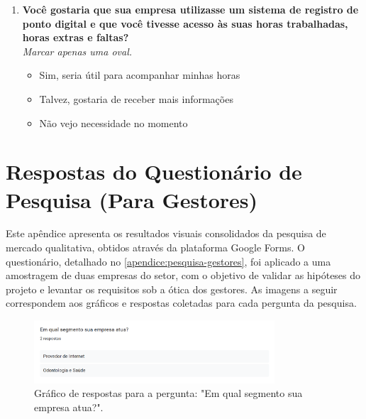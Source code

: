\begin{apendicesenv}
\begin{enumerate}
  \item \textbf{Você gostaria que sua empresa utilizasse um sistema de registro de ponto digital e que você tivesse acesso às suas horas trabalhadas, horas extras e faltas?} \\
        \textit{Marcar apenas uma oval.}
        \begin{itemize}
          \item Sim, seria útil para acompanhar minhas horas
          \item Talvez, gostaria de receber mais informações
          \item Não vejo necessidade no momento
        \end{itemize}
\end{enumerate}


\chapter{Respostas do Questionário de Pesquisa (Para Gestores)}
\label{apendice:respostas-gestores}

Este apêndice apresenta os resultados visuais consolidados da pesquisa de mercado qualitativa, obtidos através da plataforma Google Forms. O questionário, detalhado no \autoref{apendice:pesquisa-gestores}, foi aplicado a uma amostragem de duas empresas do setor, com o objetivo de validar as hipóteses do projeto e levantar os requisitos sob a ótica dos gestores. As imagens a seguir correspondem aos gráficos e respostas coletadas para cada pergunta da pesquisa.


\begin{figure}[h!]
  \centering
  \includegraphics[width=0.8\textwidth]{imagens/segmento.png}
  \caption{Gráfico de respostas para a pergunta: "Em qual segmento sua empresa atua?".}
  \label{fig:resp-gestor-segmento}
\end{figure}


\end{apendicesenv}
